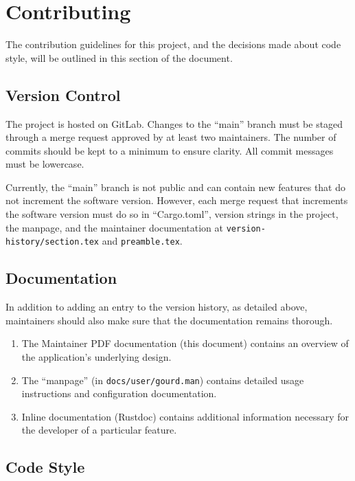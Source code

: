 \pagebreak


\section{Contributing}

The contribution guidelines for this project, and the decisions made about code style,
will be outlined in this section of the document.

\subsection{Version Control}

The project is hosted on GitLab.
Changes to the ``main'' branch must be staged through a merge request approved by at least two maintainers.
The number of commits should be kept to a minimum to ensure clarity.
All commit messages must be lowercase.

Currently, the ``main'' branch is not public and can contain new features that do not increment the software version.
However, each merge request that increments the software version must do so in ``Cargo.toml'', version strings in the project,
the manpage, and the maintainer documentation at \texttt{version-history/section.tex} and \texttt{preamble.tex}.

\subsection{Documentation}

In addition to adding an entry to the version history, as detailed above, maintainers should also make sure that the
documentation remains thorough.
\begin{enumerate}
  \item The Maintainer PDF documentation (this document) contains an overview of the application's underlying design.
  \item The ``manpage'' (in \verb|docs/user/gourd.man|) contains detailed usage instructions and configuration documentation.
  \item Inline documentation (Rustdoc) contains additional information necessary for the developer of a particular feature.
\end{enumerate}

\subsection{Code Style}

